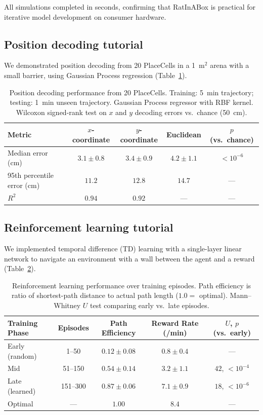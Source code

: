 \documentclass[11pt]{article}
\begin{document}
All simulations completed in seconds, confirming that RatInABox is practical for iterative model development on consumer hardware.

\subsection{Position decoding tutorial}

We demonstrated position decoding from 20 PlaceCells in a 1~m$^{2}$ arena with a small barrier, using Gaussian Process regression \citep{rasmussen2006gaussian} (Table~\ref{tab:decoding}).

\begin{table}[H]
\centering
\caption{Position decoding performance from 20 PlaceCells. Training: 5~min trajectory; testing: 1~min unseen trajectory. Gaussian Process regressor with RBF kernel. Wilcoxon signed-rank test on $x$ and $y$ decoding errors vs.\ chance (50~cm).}
\label{tab:decoding}
\begin{tabular}{lcccc}
\toprule
\textbf{Metric} & \textbf{$x$-coordinate} & \textbf{$y$-coordinate} & \textbf{Euclidean} & \textbf{$p$ (vs.\ chance)} \\
\midrule
Median error (cm) & $3.1 \pm 0.8$ & $3.4 \pm 0.9$ & $4.2 \pm 1.1$ & $< 10^{-6}$ \\
95th percentile error (cm) & $11.2$ & $12.8$ & $14.7$ & --- \\
$R^{2}$ & $0.94$ & $0.92$ & --- & --- \\
\bottomrule
\end{tabular}
\end{table}

\subsection{Reinforcement learning tutorial}

We implemented temporal difference (TD) learning \citep{sutton1988learning} with a single-layer linear network to navigate an environment with a wall between the agent and a reward (Table~\ref{tab:rl}).

\begin{table}[H]
\centering
\caption{Reinforcement learning performance over training episodes. Path efficiency is ratio of shortest-path distance to actual path length ($1.0 =$ optimal). Mann--Whitney $U$ test comparing early vs.\ late episodes.}
\label{tab:rl}
\begin{tabular}{lcccc}
\toprule
\textbf{Training Phase} & \textbf{Episodes} & \textbf{Path Efficiency} & \textbf{Reward Rate (/min)} & \textbf{$U$, $p$ (vs.\ early)} \\
\midrule
Early (random) & 1--50 & $0.12 \pm 0.08$ & $0.8 \pm 0.4$ & --- \\
Mid & 51--150 & $0.54 \pm 0.14$ & $3.2 \pm 1.1$ & $42$, $< 10^{-4}$ \\
Late (learned) & 151--300 & $0.87 \pm 0.06$ & $7.1 \pm 0.9$ & $18$, $< 10^{-6}$ \\
Optimal & --- & $1.00$ & $8.4$ & --- \\
\bottomrule
\end{tabular}
\end{table}
\end{document}
